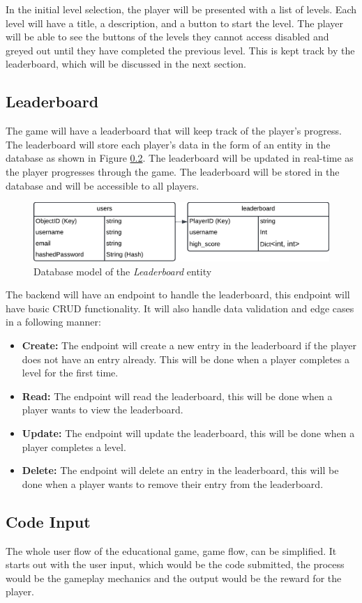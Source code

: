 In the initial level selection, the player will be presented with a list of levels. Each level will have a title, a description, and a button to start the level. The player will be able to see the buttons of the levels they cannot access disabled and greyed out until they have completed the previous level. This is kept track by the leaderboard, which will be discussed in the next section.

\subsection{Leaderboard}
The game will have a leaderboard that will keep track of the player's progress. The leaderboard will store each player's data in the form of an entity in the database as shown in Figure \ref{}. The leaderboard will be updated in real-time as the player progresses through the game. The leaderboard will be stored in the database and will be accessible to all players.
\begin{figure}[h]
    \centering
    \includegraphics[width=0.5\linewidth]{images/leaderboard_object.png}
    \caption{Database model of the \textit{Leaderboard} entity}    
    \label{fig:users}
\end{figure}
The backend will have an endpoint to handle the leaderboard, this endpoint will have basic CRUD functionality. It will also handle data validation and edge cases in a following manner:
\begin{itemize}
    \item \textbf{Create:} The endpoint will create a new entry in the leaderboard if the player does not have an entry already. This will be done when a player completes a level for the first time. 
    \item \textbf{Read:} The endpoint will read the leaderboard, this will be done when a player wants to view the leaderboard.
    \item \textbf{Update:} The endpoint will update the leaderboard, this will be done when a player completes a level.
    \item \textbf{Delete:} The endpoint will delete an entry in the leaderboard, this will be done when a player wants to remove their entry from the leaderboard.
\end{itemize}

\subsection{Code Input}
The whole user flow of the educational game, game flow\cite{kramarzewski2018practical}, can be simplified. It starts out with the user input, which would be the code submitted, the process would be the gameplay mechanics and the output would be the reward for the player. 

